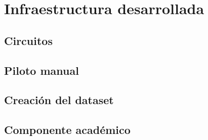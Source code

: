 \chapter{Infraestructura desarrollada}\label{cap.infraestructura}

\section{Circuitos}

\section{Piloto manual}

\section{Creación del dataset}

\section{Componente académico}
